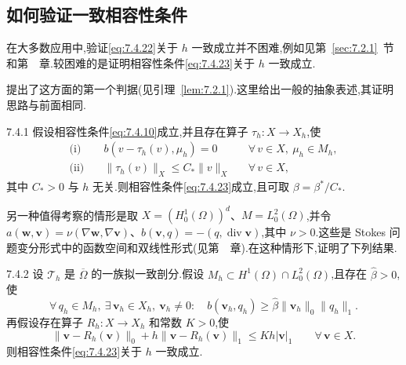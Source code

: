 \subsection{如何验证一致相容性条件}\label{sec:7.4.3}

在大多数应用中,验证\eqref{eq:7.4.22}关于 \(h\) 一致成立并不困难,例如见第~\ref{sec:7.2.1}~节和第~~章.较困难的是证明相容性条件\eqref{eq:7.4.23}关于 \(h\) 一致成立.

提出了这方面的第一个判据(见引理~\ref{lem:7.2.1}).这里给出一般的抽象表述,其证明思路与前面相同.

\begin{lemma}[Fortin]{7.4.1}
假设相容性条件\eqref{eq:7.4.10}成立,并且存在算子 \(\tau_h\colon X\to X_h\),使
\[
  \begin{aligned}
    \text{(i)}\quad &b(v-\tau_h(v),\mu_h)=0 &&\forall\,v\in X,\ \mu_h\in M_h,\\
    \text{(ii)}\quad &\|\tau_h(v)\|_X\le C_*\|v\|_X &&\forall\,v\in X,
  \end{aligned}
\]
其中 \(C_*>0\) 与 \(h\) 无关.则相容性条件\eqref{eq:7.4.23}成立,且可取 \(\beta=\beta^*/C_*\).
\end{lemma}

另一种值得考察的情形是取 \(X=(H_0^1(\Omega))^d\)、\(M=L_0^2(\Omega)\),并令 \(a(\boldsymbol{w},\boldsymbol{v})=\nu(\nabla\boldsymbol{w},\nabla\boldsymbol{v})\)、\(b(\boldsymbol{v},q)=-(q,\operatorname{div}\boldsymbol{v})\),其中 \(\nu>0\).这些是 Stokes 问题变分形式中的函数空间和双线性形式(见第~~章).在这种情形下,证明了下列结果.

\begin{lemma}[Verfürth]{7.4.2}
设 \(\mathcal T_h\) 是 \(\overline\Omega\) 的一族拟一致剖分.假设 \(M_h\subset H^1(\Omega)\cap L_0^2(\Omega)\),且存在 \(\widehat\beta>0\),使
\begin{equation}\label{eq:7.4.27}
  \forall\,q_h\in M_h,\ \exists\,\boldsymbol{v}_h\in X_h,\ \boldsymbol{v}_h\ne0:\quad
     b(\boldsymbol{v}_h,q_h)\ge\widehat\beta\|\boldsymbol{v}_h\|_0\|q_h\|_1.
\end{equation}
再假设存在算子 \(R_h\colon X\to X_h\) 和常数 \(K>0\),使
\begin{equation}\label{eq:7.4.28}
  \|\boldsymbol{v}-R_h(\boldsymbol{v})\|_0+h\|\boldsymbol{v}-R_h(\boldsymbol{v})\|_1
     \le Kh|\boldsymbol{v}|_1\qquad\forall\,\boldsymbol{v}\in X.
\end{equation}
则相容性条件\eqref{eq:7.4.23}关于 \(h\) 一致成立.
\end{lemma}

